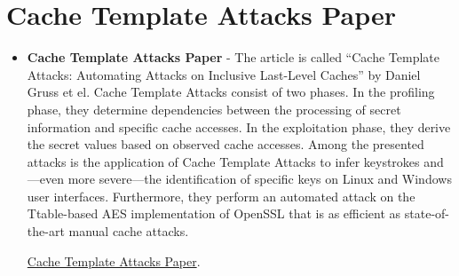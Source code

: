 \section{Cache Template Attacks Paper} \label{sec:Cache Template Attacks Paper}
\begin{itemize}
    \item \textbf{Cache Template Attacks Paper} - The article is called “Cache Template Attacks:
    Automating Attacks on Inclusive Last-Level Caches” by Daniel Gruss et el.
    Cache Template Attacks consist of two phases. In the
    profiling phase, they determine dependencies between the
    processing of secret information and specific
    cache accesses. In the exploitation phase, they derive the
    secret values based on observed cache accesses.
    Among the presented attacks is the application of Cache
    Template Attacks to infer keystrokes and—even more
    severe—the identification of specific keys on Linux and
    Windows user interfaces.
    Furthermore, they perform an automated attack on the Ttable-based AES implementation of OpenSSL that is as
    efficient as state-of-the-art manual cache attacks.
    
    \href{https://www.usenix.org/system/files/conference/usenixsecurity15/sec15-paper-gruss.pdf}{Cache Template Attacks Paper}.
\end{itemize}
